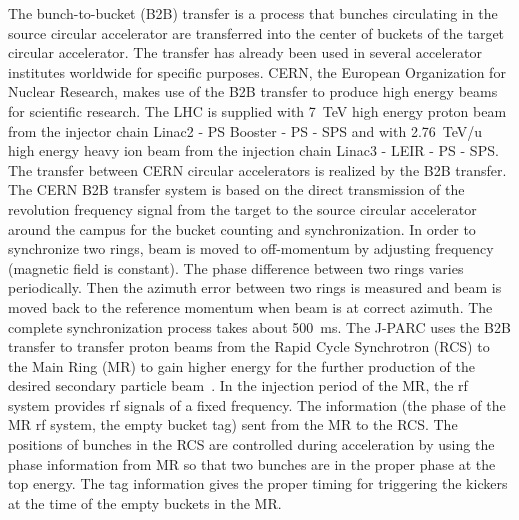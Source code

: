 The bunch-to-bucket (B2B) transfer is a process that bunches circulating in the source circular accelerator are transferred into the center of buckets of the target circular accelerator. The transfer has already been used in several accelerator institutes worldwide for specific purposes. CERN, the European Organization for Nuclear Research, makes use of the B2B transfer to produce high energy beams for scientific research. The LHC is supplied with \SI{7}{TeV} high energy proton beam from the injector chain Linac2 - PS Booster - PS - SPS and with \SI{2.76}{TeV/u} high energy heavy ion beam from the injection chain Linac3 - LEIR - PS - SPS. The transfer between CERN circular accelerators is realized by the B2B transfer. The CERN B2B transfer system is based on the direct transmission of the revolution frequency signal from the target to the source circular accelerator around the campus for the bucket counting and synchronization. In order to synchronize two rings, beam is moved to off-momentum by adjusting frequency (magnetic field is constant). The phase difference between two rings varies periodically. Then the azimuth error between two rings is measured and beam is moved back to the reference momentum when beam is at correct azimuth. The complete synchronization process takes about \SI{500}{\ms}. The J-PARC uses the B2B transfer to transfer proton beams from the Rapid Cycle Synchrotron (RCS) to the Main Ring (MR) to gain higher energy for the further production of the desired secondary particle beam~\cite{noauthor_j-parc_2016}. In the
injection period of the MR, the rf system provides rf signals of a fixed frequency.
The information (the phase of the MR rf system, the empty bucket tag) sent from the MR to the RCS. The positions of bunches in the RCS are controlled during acceleration by using the phase information from MR so that two bunches are in the proper phase at the top energy. The
tag information gives the proper timing for triggering the kickers at the time of the
empty buckets in the MR. 

